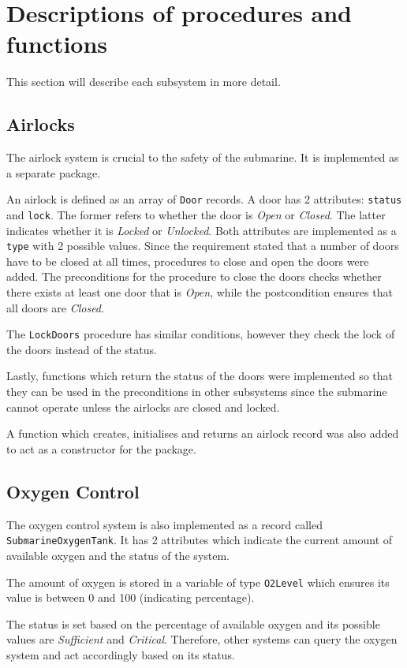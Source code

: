 \documentclass{llncs}
\begin{document}
\section{Descriptions of procedures and functions}
This section will describe each subsystem in more detail.

\subsection{Airlocks}
The airlock system is crucial to the safety of the submarine. It is implemented as a separate package. 

An airlock is defined as an array of \texttt{Door} records. A door has 2 attributes: \texttt{status} and \texttt{lock}. The former refers to whether the door is \textit{Open} or \textit{Closed}. The latter indicates whether it is \textit{Locked} or \textit{Unlocked}. Both attributes are implemented as a \texttt{type} with 2 possible values. Since the requirement stated that a number of doors have to be closed at all times, procedures to close and open the doors were added. The preconditions for the procedure to close the doors checks whether there exists at least one door that is \textit{Open}, while the postcondition ensures that all doors are \textit{Closed}. 

The \texttt{LockDoors} procedure has similar conditions, however they check the lock of the doors instead of the status. 

Lastly, functions which return the status of the doors were implemented so that they can be used in the preconditions in other subsystems since the submarine cannot operate unless the airlocks are closed and locked.

A function which creates, initialises and returns an airlock record was also added to act as a constructor for the package.

\subsection{Oxygen Control}
The oxygen control system is also implemented as a record called \texttt{SubmarineOxygenTank}. It has 2 attributes which indicate the current amount of available oxygen and the status of the system. 

The amount of oxygen is stored in a variable of type \texttt{O2Level} which ensures its value is between 0 and 100 (indicating percentage). 

The status is set based on the percentage of available oxygen and its possible values are \textit{Sufficient} and \textit{Critical}. Therefore, other systems can query the oxygen system and act accordingly based on its status.
\end{document}
